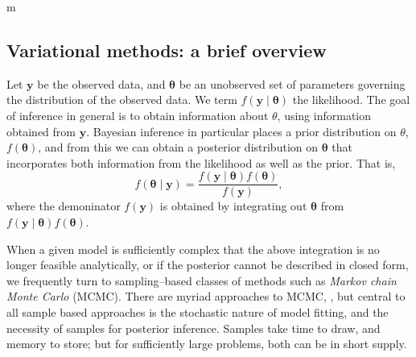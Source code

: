 m%

\subsection{Variational methods: a brief overview}
Let $\bm{y}$ be the observed data, and $\bm{\theta}$ be an unobserved set of 
    parameters governing the distribution of the observed data.  We term 
    $f(\bm{y}\mid\bm{\theta})$ the likelihood.  The goal of inference in 
    general is to obtain information about $\theta$, using information 
    obtained from $\bm{y}$. Bayesian inference in particular places a prior
    distribution on $\theta$, $f(\bm{\theta})$, and from this we can obtain a
    posterior distribution on $\bm{\theta}$ that incorporates both information
    from the likelihood as well as the prior.  That is,
    \[
        f(\bm{\theta}\mid\bm{y}) = 
            \frac{f(\bm{y}\mid\bm{\theta})f(\bm{\theta})}{f(\bm{y})},
    \]
    where the demoninator $f(\bm{y})$ is obtained by integrating out 
    $\bm{\theta}$ from $f(\bm{y}\mid\bm{\theta})f(\bm{\theta})$.

When a given model is sufficiently complex that the above integration is no
    longer feasible analytically, or if the posterior cannot be described in
    closed form, we frequently turn to sampling--based classes of methods such as 
    \emph{Markov chain Monte Carlo} (MCMC)\needcite. There are myriad approaches 
    to MCMC, , but central to all sample
    based approaches is the stochastic nature of model fitting, and the 
    necessity of samples for posterior inference.  Samples take time to draw,
    and memory to store; but for sufficiently large problems, both can be in short 
    supply.

